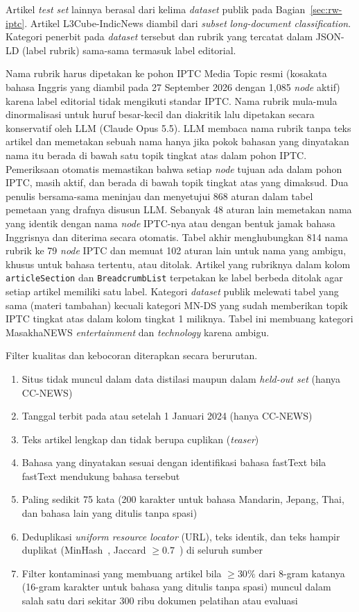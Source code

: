 \documentclass{ieeeaccess}
\newcommand{\en}[1]{\textit{#1}}
\begin{document}
Artikel \en{test set} lainnya berasal dari kelima \en{dataset} publik pada Bagian~\ref{sec:rw-iptc}. Artikel L3Cube-IndicNews diambil dari \en{subset} \en{long-document classification}. Kategori penerbit pada \en{dataset} tersebut dan rubrik yang tercatat dalam JSON-LD (label rubrik) sama-sama termasuk label editorial.

Nama rubrik harus dipetakan ke pohon IPTC Media Topic resmi (kosakata bahasa Inggris yang diambil pada 27 September 2026 dengan 1,085 \en{node} aktif) karena label editorial tidak mengikuti standar IPTC. Nama rubrik mula-mula dinormalisasi untuk huruf besar-kecil dan diakritik lalu dipetakan secara konservatif oleh LLM (Claude Opus 5.5). LLM membaca nama rubrik tanpa teks artikel dan memetakan sebuah nama hanya jika pokok bahasan yang dinyatakan nama itu berada di bawah satu topik tingkat atas dalam pohon IPTC. Pemeriksaan otomatis memastikan bahwa setiap \en{node} tujuan ada dalam pohon IPTC, masih aktif, dan berada di bawah topik tingkat atas yang dimaksud. Dua penulis bersama-sama meninjau dan menyetujui 868 aturan dalam tabel pemetaan yang drafnya disusun LLM. Sebanyak 48 aturan lain memetakan nama yang identik dengan nama \en{node} IPTC-nya atau dengan bentuk jamak bahasa Inggrisnya dan diterima secara otomatis. Tabel akhir menghubungkan 814 nama rubrik ke 79 \en{node} IPTC dan memuat 102 aturan lain untuk nama yang ambigu, khusus untuk bahasa tertentu, atau ditolak. Artikel yang rubriknya dalam kolom \texttt{articleSection} dan \texttt{BreadcrumbList} terpetakan ke label berbeda ditolak agar setiap artikel memiliki satu label. Kategori \en{dataset} publik melewati tabel yang sama (materi tambahan) kecuali kategori MN-DS yang sudah memberikan topik IPTC tingkat atas dalam kolom tingkat 1 miliknya. Tabel ini membuang kategori MasakhaNEWS \emph{entertainment} dan \emph{technology} karena ambigu.

Filter kualitas dan kebocoran diterapkan secara berurutan.
\begin{enumerate}
  \item Situs tidak muncul dalam data distilasi maupun dalam \en{held-out set} (hanya CC-NEWS)
  \item Tanggal terbit pada atau setelah 1 Januari 2024 (hanya CC-NEWS)
  \item Teks artikel lengkap dan tidak berupa cuplikan (\en{teaser})
  \item Bahasa yang dinyatakan sesuai dengan identifikasi bahasa fastText bila fastText mendukung bahasa tersebut
  \item Paling sedikit 75 kata (200 karakter untuk bahasa Mandarin, Jepang, Thai, dan bahasa lain yang ditulis tanpa spasi)
  \item Deduplikasi \en{uniform resource locator} (URL), teks identik, dan teks hampir duplikat (MinHash~\cite{broder1997resemblance}, Jaccard $\ge 0.7$~\cite{lee2022dedup}) di seluruh sumber
  \item Filter kontaminasi yang membuang artikel bila $\ge 30\%$ dari 8-gram katanya (16-gram karakter untuk bahasa yang ditulis tanpa spasi) muncul dalam salah satu dari sekitar 300 ribu dokumen pelatihan atau evaluasi
\end{enumerate}
\end{document}
